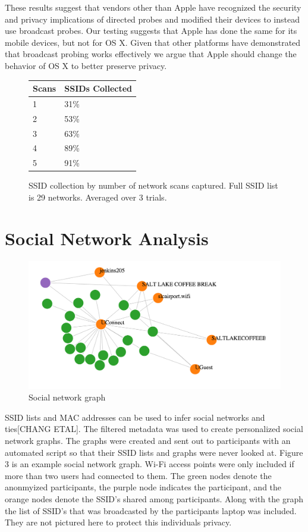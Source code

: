\documentclass[letterpaper,twocolumn,10pt]{article}
\begin{document}
These results suggest that vendors other than Apple have recognized the security and privacy implications of directed probes and modified their devices to instead use broadcast probes. Our testing suggests that Apple has done the same for its mobile devices, but not for OS X. Given that other platforms have demonstrated that broadcast probing works effectively we argue that Apple should change the behavior of OS X to better preserve privacy.

\begin{figure}
\centering
\begin{tabular}{l | l}
Scans & SSIDs Collected \\ 
\hline
1 & 31\% \\
2 & 53\% \\
3 & 63\% \\
4 & 89\% \\
5 & 91\% \\
\end{tabular}
\caption{SSID collection by number of network scans captured. Full SSID list is 29 networks. Averaged over 3 trials.}
\end{figure}

\section{Social Network Analysis}
\begin{figure}
\centering
\includegraphics[scale=.5]{graph.png}
\caption{\textsf{Social network graph}}
\end{figure}
SSID lists and MAC addresses can be used to infer social networks and ties[CHANG ETAL]. The filtered metadata was used to create personalized social network graphs. The graphs were created and sent out to participants with an automated script so that their SSID lists and graphs were never looked at. 
Figure 3 is an example social network graph. Wi-Fi access points were only included if more than two users had connected to them. The green nodes denote the anonmyized participants, the purple node indicates the participant, and the orange nodes denote the SSID's shared among participants. Along with the graph the list of SSID's that was broadcasted by the participants laptop was included. They are not pictured here to protect this individuals privacy.
\end{document}
